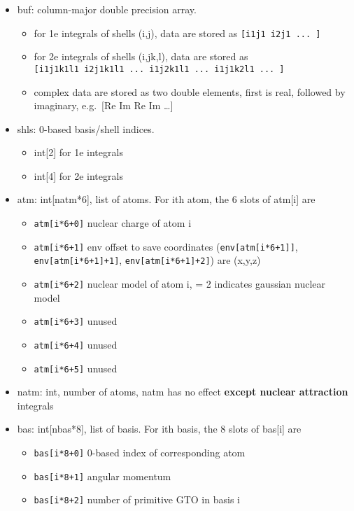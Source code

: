 \documentclass{article}
\begin{document}
\begin{itemize}
\item
  buf: column-major double precision array.
  \begin{itemize}
  \item
    for 1e integrals of shells (i,j), data are stored as
    \verb![i1j1 i2j1 ... ]!
  \item
    for 2e integrals of shells (i,j\textbar{}k,l), data are stored as\\
    \verb![i1j1k1l1 i2j1k1l1 ... i1j2k1l1 ... i1j1k2l1 ... ]!
  \item
    complex data are stored as two double elements, first is real,
    followed by imaginary, e.g.~[Re Im Re Im \ldots{}]
  \end{itemize}
\item
  shls: 0-based basis/shell indices.
  \begin{itemize}
  \item
    int[2] for 1e integrals
  \item
    int[4] for 2e integrals
  \end{itemize}
\item
  atm: int[natm*6], list of atoms. For ith atom, the 6 slots of
  atm[i] are
  \begin{itemize}
  \item
    \verb!atm[i*6+0]! nuclear charge of atom i
  \item
    \verb!atm[i*6+1]! env offset to save coordinates
    (\verb!env[atm[i*6+1]]!, \verb!env[atm[i*6+1]+1]!,
    \verb!env[atm[i*6+1]+2]!) are (x,y,z)
  \item
    \verb!atm[i*6+2]! nuclear model of atom i, = 2 indicates gaussian
    nuclear model
  \item
    \verb!atm[i*6+3]! unused
  \item
    \verb!atm[i*6+4]! unused
  \item
    \verb!atm[i*6+5]! unused
  \end{itemize}
\item
  natm: int, number of atoms, natm has no effect
  \textbf{except nuclear attraction} integrals
\item
  bas: int[nbas*8], list of basis. For ith basis, the 8 slots of
  bas[i] are
  \begin{itemize}
  \item
    \verb!bas[i*8+0]! 0-based index of corresponding atom
  \item
    \verb!bas[i*8+1]! angular momentum
  \item
    \verb!bas[i*8+2]! number of primitive GTO in basis i

\end{itemize}
\end{itemize}
\end{document}
